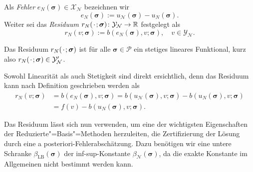 \documentclass[../main.tex]{subfiles}
\begin{document}
\begin{Definition}
\label{definition:rbm_fehler_und_residuum}
    Als \emph{Fehler} $e_{N}(\bm \sigma) \in \mathcal X_{\mathcal N}$ bezeichnen wir
    \begin{equation}
        e_{N}(\bm \sigma) := u_{\mathcal N}(\bm \sigma) - u_{N}(\bm \sigma).
    \end{equation}
    Weiter sei das \emph{Residuum} $r_{N}({\mkern2mu\cdot\mkern2mu}; \bm \sigma) \colon \mathcal Y_{\mathcal N} \to \mathbb{R}$ festgelegt als
    \begin{equation}
    \label{eq:variationsproblem_residuum}
        r_{N}(v; \bm \sigma) := b(e_{N}(\bm \sigma), v; \bm \sigma), \quad v \in \mathcal Y_{\mathcal N}.
    \end{equation}
\end{Definition}

\begin{Lemma}
\label{lemma:rbm_residuum_ist_funktional}
    Das Residuum $r_{N}({\mkern2mu\cdot\mkern2mu}; \bm \sigma)$ ist für alle $\bm \sigma \in \mathcal P$ ein stetiges lineares Funktional, kurz also $r_{N}({\mkern2mu\cdot\mkern2mu}; \bm \sigma) \in \mathcal Y_{\mathcal N}'$.

    \begin{Beweis}
        Sowohl Linearität als auch Stetigkeit sind direkt ersichtlich, denn das Residuum kann nach Definition geschrieben werden als
        \begin{equation}
            \begin{aligned}
            r_{N}(v; \bm \sigma)
            &= b(e_{N}(\bm \sigma), v; \bm \sigma)
            = b(u_{\mathcal N}(\bm \sigma), v; \bm \sigma) - b(u_{N}(\bm \sigma), v; \bm \sigma)
            \\&= f(v) - b(u_{N}(\bm \sigma), v; \bm \sigma).
            \end{aligned}
        \end{equation}
    \end{Beweis}
\end{Lemma}

Das Residuum lässt sich nun verwenden, um eine der wichtigsten Eigenschaften der Reduzierte"=Basis"=Methoden herzuleiten, die Zertifizierung der Lösung durch eine a posteriori-Fehlerabschätzung.
Dazu benötigen wir eine untere Schranke $\beta_{\mathrm{LB}}(\bm \sigma)$ der inf-sup-Konstante $\beta_{\mathcal N}(\bm \sigma)$, da die exakte Konstante im Allgemeinen nicht bestimmt werden kann.
\end{document}
